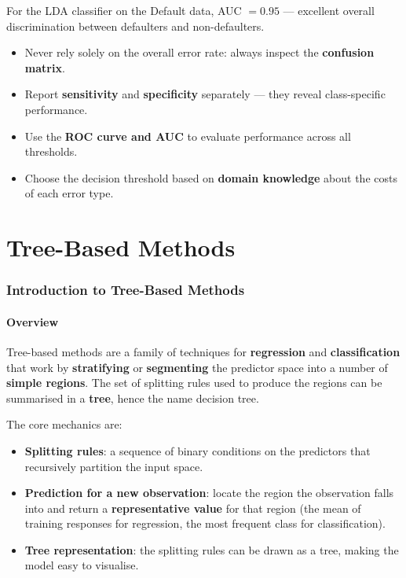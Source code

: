 \documentclass[11pt,a4paper]{article}
\theoremstyle{definition}
\theoremstyle{plain}
\theoremstyle{remark}
\begin{document}
For the LDA classifier on the Default data, AUC $= \mathbf{0.95}$ — excellent overall discrimination between defaulters and non-defaulters.

\begin{tcolorbox}[colback=green!5!white,colframe=green!75!black,title=\textbf{Key Takeaways for Classifier Evaluation}]
\begin{itemize}
    \item Never rely solely on the overall error rate: always inspect the \textbf{confusion matrix}.
    \item Report \textbf{sensitivity} and \textbf{specificity} separately — they reveal class-specific performance.
    \item Use the \textbf{ROC curve and AUC} to evaluate performance across all thresholds.
    \item Choose the decision threshold based on \textbf{domain knowledge} about the costs of each error type.
\end{itemize}
\end{tcolorbox}


\part{Tree-Based Methods}

\section{Introduction to Tree-Based Methods}

\subsection{Overview}

\begin{tcolorbox}[colback=blue!5!white,colframe=blue!75!black,title=\textbf{Tree-Based Methods}]
Tree-based methods are a family of techniques for \textbf{regression} and \textbf{classification} that work by \textbf{stratifying} or \textbf{segmenting} the predictor space into a number of \textbf{simple regions}. The set of splitting rules used to produce the regions can be summarised in a \textbf{tree}, hence the name decision tree.
\end{tcolorbox}

The core mechanics are:
\begin{itemize}
    \item \textbf{Splitting rules}: a sequence of binary conditions on the predictors that recursively partition the input space.
    \item \textbf{Prediction for a new observation}: locate the region the observation falls into and return a \textbf{representative value} for that region (the mean of training responses for regression, the most frequent class for classification).
    \item \textbf{Tree representation}: the splitting rules can be drawn as a tree, making the model easy to visualise.
\end{itemize}
\end{document}
